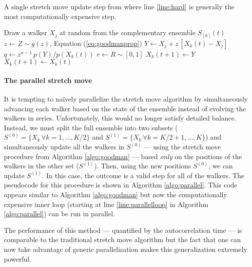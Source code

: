 \documentclass[12pt,preprint]{aastex}
\newcommand{\Eq}[1]{Equation (\ref{eq:#1})}
\newcommand{\eq}[1]{Equation (\ref{eq:#1})}
\newcommand{\algo}[1]{Algorithm \ref{algo:#1}}
\newcommand{\algolabel}[1]{\label{algo:#1}}
\newcommand{\ensemble}{S}
\newcommand{\colorens}[1]{\ensemble^{(#1)}}
\newcommand{\red}{\colorens{0}}
\newcommand{\blue}{\colorens{1}}
\renewcommand{\vector}[1]{#1}
\begin{document}
\begin{algorithm}
\caption{A single stretch move update step from  where
    line \ref{line:hard} is generally the most computationally expensive
    step. \algolabel{goodman}}
\begin{algorithmic}[1]
    \STATE Draw a walker $X_j$ at random from the complementary ensemble %
        $\ensemble_{[k]}(t)$
    \STATE $z \gets Z \sim g(z)$, \Eq{goodmanprop}
    \STATE $\vector{Y} \gets \vector{X_j} %
                + z \, [ \vector{X_k} (t) - \vector{X_j}]$
    \STATE $q \gets z^{n-1} \, p(Y)/p(X_k(t))$ \label{line:hard}
    \STATE $r \gets R \sim [0, 1]$
    \IF{$R \ge q$, \eq{acceptance}}
        \STATE $X_k(t+1) \gets Y$
    \ELSE
        \STATE $X_k(t+1) \gets X_k(t)$
    \ENDIF
\ENDFOR
\end{algorithmic}
\end{algorithm}

\paragraph{The parallel stretch move}

It is tempting to na\"ively parallelize the stretch move algorithm by
simultaneously advancing each walker based on the state of the ensemble
instead of evolving the walkers in series. Unfortunately, this would no
longer satisfy detailed balance. Instead, we must split the full ensemble
into two subsets
($\red = \{ \vector{X_k} \, \forall k = 1, \ldots, K/2 \}$ and
$\blue = \{ \vector{X_k} \, \forall k = K/2+1, \ldots, K \}$) and
simultaneously update all the walkers in $\red$
--- using the stretch move procedure from \algo{goodman} ---
based \emph{only} on the positions of the walkers in the other set
($\blue$). Then, using the new positions $\red$,
we can update $\blue$. In this case, the outcome is a valid step
for all of the walkers. The pseudocode for
this procedure is shown in \algo{parallel}. This code appears similar to
\algo{goodman} but now the computationally expensive inner loop
(starting at line \ref{line:parallelloop} in \algo{parallel}) can be run in
parallel.

The performance of this method --- quantified by the autocorrelation time ---
is comparable to the traditional stretch move algorithm but the fact that one
can now take advantage of generic parallelization makes this generalization
extremely powerful.
\end{document}
